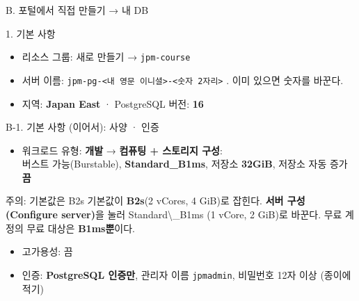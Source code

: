 \begin{frame}{B. 포털에서 직접 만들기 → 내 DB}
\begin{center}
\end{center}
\vspace{0.2em}
\begin{block}{1. 기본 사항}
\begin{itemize}
\item 리소스 그룹: 새로 만들기 → \texttt{jpm-course}
\item 서버 이름: \texttt{jpm-pg-<내 영문 이니셜>-<숫자 2자리>} . 이미 있으면 숫자를 바꾼다.
\item 지역: \textbf{Japan East} · PostgreSQL 버전: \textbf{16}
\end{itemize}
\end{block}
\end{frame}

\begin{frame}{B-1. 기본 사항 (이어서): 사양 · 인증}
\small
\begin{itemize}
\item 워크로드 유형: \textbf{개발} → \textbf{컴퓨팅 + 스토리지 구성}:\\
  버스트 가능(Burstable), \textbf{Standard\_B1ms}, 저장소 \textbf{32GiB}, 저장소 자동 증가 \textbf{끔}
\end{itemize}
\begin{alertblock}{주의: 기본값은 B2s}
기본값이 \textbf{B2s}(2 vCores, 4 GiB)로 잡힌다. \textbf{서버 구성(Configure server)}을 눌러
\num{Standard\_B1ms (1 vCore, 2 GiB)}로 바꾼다. 무료 계정의 무료 대상은 \textbf{B1ms뿐}이다.
\end{alertblock}
\begin{itemize}
\item 고가용성: 끔
\item 인증: \textbf{PostgreSQL 인증만}, 관리자 이름 \texttt{jpmadmin}, 비밀번호 12자 이상 \alert{(종이에 적기)}
\end{itemize}
\end{frame}


